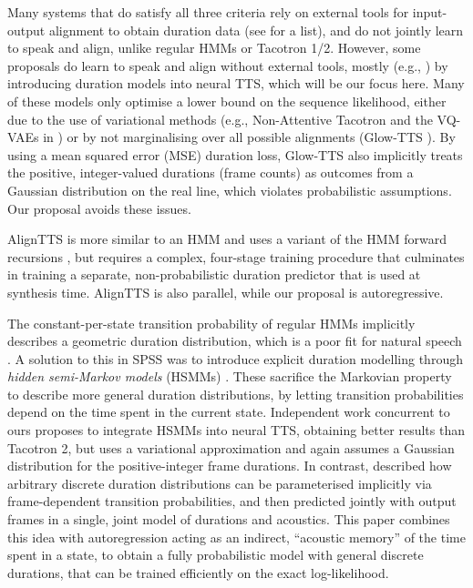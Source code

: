 \documentclass[british]{article}
\begin{document}
Many systems that do satisfy all three criteria
rely on external tools for input-output alignment to obtain duration data (see \cite{tan2021survey} for a list), and do not jointly learn to speak and align, unlike regular HMMs or Tacotron 1/2.
However, some proposals
do learn to speak and align without external tools,
mostly (e.g., \cite{yasuda2019initial,zeng2020aligntts,kim2020glow,shen2020non,yasuda2021end,nankaku2021neural,fujimoto2022autoregressive}) by introducing duration models into neural TTS, which will be our focus here.
Many of these models only optimise a lower bound on the sequence likelihood, either due to the use of variational methods (e.g., Non-Attentive Tacotron \cite{shen2020non} and the VQ-VAEs in \cite{yasuda2021end}) or by not marginalising over all possible alignments (Glow-TTS \cite{kim2020glow}).
By using a mean squared error (MSE) duration loss, Glow-TTS also implicitly treats the positive, integer-valued durations (frame counts) as outcomes from a Gaussian distribution on the real line, which violates probabilistic assumptions.
Our proposal avoids these issues.

AlignTTS \cite{zeng2020aligntts} is more similar to an HMM and uses a variant of the HMM forward recursions \cite{rabiner1989tutorial}, but requires a complex, four-stage training procedure that culminates in training a separate, non-probabilistic duration predictor that is used at synthesis time.
AlignTTS is also parallel, while our proposal is autoregressive.



The constant-per-state transition probability of regular HMMs implicitly describes a
geometric duration distribution, which is a poor fit for natural speech
\cite{zen2004hidden,ronanki2016median}.
A solution to this in SPSS was to introduce explicit duration modelling through \emph{hidden semi-Markov models} (HSMMs) \cite{zen2004hidden}.
These sacrifice the Markovian property to describe more general duration distributions, by letting transition probabilities depend on the time spent in the current state.
Independent work \cite{nankaku2021neural,fujimoto2022autoregressive} concurrent to ours proposes to integrate HSMMs into neural TTS, obtaining better results than Tacotron 2, but uses a variational approximation and again assumes a Gaussian distribution for the positive-integer frame durations.
In contrast, \cite{ronanki2016median} described how
arbitrary discrete
duration distributions can be parameterised implicitly via frame-dependent transition probabilities, and then predicted jointly with output frames in a single, joint model of durations and acoustics.
This paper combines this idea with autoregression acting as an indirect, ``acoustic memory'' of the time spent in a state, to obtain a fully probabilistic model with general discrete durations, that can be trained efficiently on the exact log-likelihood. 
\end{document}
